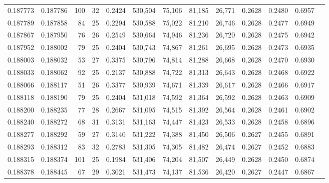 \begin{tabular}{rrrrrrrrrrrrr}
0.187773 & 0.187786 &   100 &  32 &                                     0.2424 & 530,504 &  75,106 &  81,185 &  26,771 & 0.2628 & 0.2480 & 0.6957 \\
0.187789 & 0.187858 &    84 &  25 &                                     0.2294 & 530,588 &  75,022 &  81,210 &  26,746 & 0.2628 & 0.2477 & 0.6949 \\
0.187867 & 0.187950 &    76 &  26 &                                     0.2549 & 530,664 &  74,946 &  81,236 &  26,720 & 0.2628 & 0.2475 & 0.6942 \\
0.187952 & 0.188002 &    79 &  25 &                                     0.2404 & 530,743 &  74,867 &  81,261 &  26,695 & 0.2628 & 0.2473 & 0.6935 \\
0.188003 & 0.188032 &    53 &  27 &                                     0.3375 & 530,796 &  74,814 &  81,288 &  26,668 & 0.2628 & 0.2470 & 0.6930 \\
0.188033 & 0.188062 &    92 &  25 &                                     0.2137 & 530,888 &  74,722 &  81,313 &  26,643 & 0.2628 & 0.2468 & 0.6922 \\
0.188066 & 0.188117 &    51 &  26 &                                     0.3377 & 530,939 &  74,671 &  81,339 &  26,617 & 0.2628 & 0.2466 & 0.6917 \\
0.188118 & 0.188190 &    79 &  25 &                                     0.2404 & 531,018 &  74,592 &  81,364 &  26,592 & 0.2628 & 0.2463 & 0.6909 \\
0.188200 & 0.188235 &    77 &  28 &                                     0.2667 & 531,095 &  74,515 &  81,392 &  26,564 & 0.2628 & 0.2461 & 0.6902 \\
0.188240 & 0.188272 &    68 &  31 &                                     0.3131 & 531,163 &  74,447 &  81,423 &  26,533 & 0.2628 & 0.2458 & 0.6896 \\
0.188277 & 0.188292 &    59 &  27 &                                     0.3140 & 531,222 &  74,388 &  81,450 &  26,506 & 0.2627 & 0.2455 & 0.6891 \\
0.188293 & 0.188312 &    83 &  32 &                                     0.2783 & 531,305 &  74,305 &  81,482 &  26,474 & 0.2627 & 0.2452 & 0.6883 \\
0.188315 & 0.188374 &   101 &  25 &                                     0.1984 & 531,406 &  74,204 &  81,507 &  26,449 & 0.2628 & 0.2450 & 0.6874 \\
0.188378 & 0.188445 &    67 &  29 &                                     0.3021 & 531,473 &  74,137 &  81,536 &  26,420 & 0.2627 & 0.2447 & 0.6867 \\

\end{tabular}
